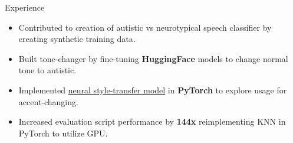 \documentclass{resume} %
\begin{document}
\begin{workSection}{Experience}
	\experienceItem[
	company=UTEP Vision and Learning Lab,
	location=El Paso{,} TX,
	position=Undergraduate Research Assistant,
	duration=January 2024 - May 2024,
	]
	\begin{itemize}
		\vspace{-0.5em}
		\itemsep -6pt {}
		\item Contributed to creation of autistic vs neurotypical speech classifier by
		creating synthetic training data.
		\item Built tone-changer by fine-tuning \textbf{HuggingFace} models to change normal tone to autistic. %
		\item Implemented \href{https://github.com/AshkanArabim/neural-style-transfer}{{neural style-transfer model}} in \textbf{PyTorch} to explore usage for accent-changing.
		\item Increased evaluation script performance by
			\textbf{144x} 
			reimplementing KNN in PyTorch to utilize GPU.
	\end{itemize}
	

\end{workSection}
\end{document}
